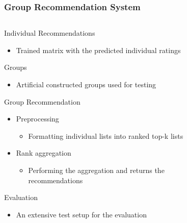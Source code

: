 \begin{frame}
\frametitle{Group Recommendation System}
\begin{columns}
	\begin{column}{0.55\textwidth}
		Individual Recommendations
		\begin{itemize}
			\small
			\item Trained matrix with the predicted individual ratings
			\normalsize
		\end{itemize}
		Groups
		\begin{itemize}
			\small
			\item Artificial constructed groups used for testing
			\normalsize
		\end{itemize}
		Group Recommendation
		\begin{itemize}
			\item Preprocessing 
			\begin{itemize}
				\item Formatting individual lists into ranked top-k lists
			\end{itemize}
			\item Rank aggregation 
			\begin{itemize}
				\item Performing the aggregation and returns the recommendations
			\end{itemize}
		\end{itemize}
		Evaluation
		\begin{itemize}
			\small
			\item An extensive test setup for the evaluation
			\normalsize
		\end{itemize}
	\end{column}
	\begin{column}{0.45\textwidth}
		\vspace{-0.3cm}
		\begin{figure}
			\centering

\end{figure}
\end{column}
\end{columns}
\end{frame}
